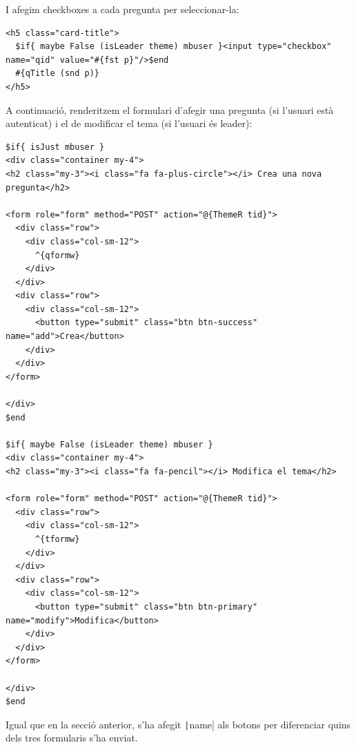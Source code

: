 \documentclass[catalan, a4paper]{scrartcl}
\begin{document}
I afegim checkboxes a cada pregunta per seleccionar-la:

\begin{verbatim}
<h5 class="card-title">
  $if{ maybe False (isLeader theme) mbuser }<input type="checkbox" name="qid" value="#{fst p}"/>$end
  #{qTitle (snd p)}
</h5>
\end{verbatim}

A continuació, renderitzem el formulari d'afegir una pregunta
(si l'usuari està autenticat) i el de modificar el tema (si l'usuari és leader):

\begin{verbatim}
$if{ isJust mbuser }
<div class="container my-4">
<h2 class="my-3"><i class="fa fa-plus-circle"></i> Crea una nova pregunta</h2>

<form role="form" method="POST" action="@{ThemeR tid}">
  <div class="row">
    <div class="col-sm-12">
      ^{qformw}
    </div>
  </div>
  <div class="row">
    <div class="col-sm-12">
      <button type="submit" class="btn btn-success" name="add">Crea</button>
    </div>
  </div>
</form>

</div>
$end

$if{ maybe False (isLeader theme) mbuser }
<div class="container my-4">
<h2 class="my-3"><i class="fa fa-pencil"></i> Modifica el tema</h2>

<form role="form" method="POST" action="@{ThemeR tid}">
  <div class="row">
    <div class="col-sm-12">
      ^{tformw}
    </div>
  </div>
  <div class="row">
    <div class="col-sm-12">
      <button type="submit" class="btn btn-primary" name="modify">Modifica</button>
    </div>
  </div>
</form>

</div>
$end
\end{verbatim}

Igual que en la secció anterior, s'ha afegit \texttt|name| als botons
per diferenciar quins dels tres formularis s'ha enviat.
\end{document}
